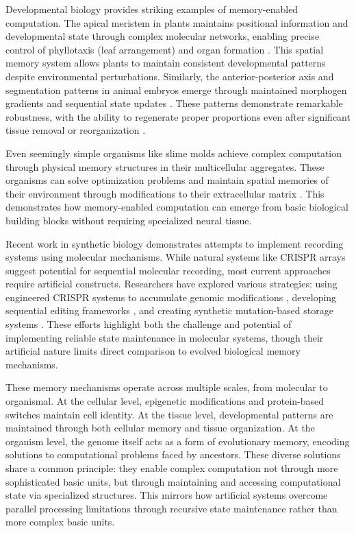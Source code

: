 \documentclass[12pt]{article}
\begin{document}
Developmental biology provides striking examples of memory-enabled computation.
The apical meristem in plants maintains positional information and developmental state through complex molecular networks, enabling precise control of phyllotaxis (leaf arrangement) and organ formation \cite{lovkvist2021using}.
This spatial memory system allows plants to maintain consistent developmental patterns despite environmental perturbations.
Similarly, the anterior-posterior axis and segmentation patterns in animal embryos emerge through maintained morphogen gradients and sequential state updates \cite{pastor2020computation}.
These patterns demonstrate remarkable robustness, with the ability to regenerate proper proportions even after significant tissue removal or reorganization \cite{lobo2012towards}.

Even seemingly simple organisms like slime molds achieve complex computation through physical memory structures in their multicellular aggregates.
These organisms can solve optimization problems and maintain spatial memories of their environment through modifications to their extracellular matrix \cite{hoel2020emergence}.
This demonstrates how memory-enabled computation can emerge from basic biological building blocks without requiring specialized neural tissue.

Recent work in synthetic biology demonstrates attempts to implement recording systems using molecular mechanisms.
While natural systems like CRISPR arrays suggest potential for sequential molecular recording, most current approaches require artificial constructs.
Researchers have explored various strategies: using engineered CRISPR systems to accumulate genomic modifications \cite{sheth2017multiplex}, developing sequential editing frameworks \cite{choi2022time}, and creating synthetic mutation-based storage systems \cite{sadremomtaz2023digital}.
These efforts highlight both the challenge and potential of implementing reliable state maintenance in molecular systems, though their artificial nature limits direct comparison to evolved biological memory mechanisms.

These memory mechanisms operate across multiple scales, from molecular to organismal.
At the cellular level, epigenetic modifications and protein-based switches maintain cell identity.
At the tissue level, developmental patterns are maintained through both cellular memory and tissue organization.
At the organism level, the genome itself acts as a form of evolutionary memory, encoding solutions to computational problems faced by ancestors.
These diverse solutions share a common principle: they enable complex computation not through more sophisticated basic units, but through maintaining and accessing computational state via specialized structures.
This mirrors how artificial systems overcome parallel processing limitations through recursive state maintenance rather than more complex basic units.
\end{document}

